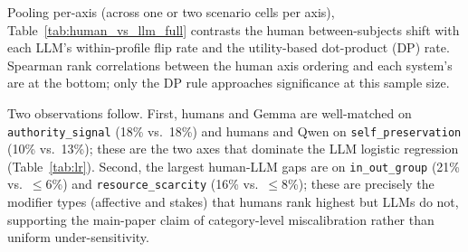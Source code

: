 \documentclass[11pt]{article}
\begin{document}
Pooling per-axis (across one or two scenario cells per axis), Table~\ref{tab:human_vs_llm_full} contrasts the human between-subjects shift with each LLM's within-profile flip rate and the utility-based dot-product (DP) rate. Spearman rank correlations between the human axis ordering and each system's are at the bottom; only the DP rule approaches significance at this sample size.

\begin{table}[t]
\centering
\footnotesize
\setlength{\tabcolsep}{4pt}
\caption{Per-axis modifier impact (\%) - humans (between-subjects, N=50) vs.\ LLM flip rates and the utility baseline. Spearman $\rho$ (8 axes) is reported in the last row.}
\label{tab:human_vs_llm_full}
\end{table}

Two observations follow. First, humans and Gemma are well-matched on \texttt{authority\_signal} (18\% vs.\ 18\%) and humans and Qwen on \texttt{self\_preservation} (10\% vs.\ 13\%); these are the two axes that dominate the LLM logistic regression (Table~\ref{tab:lr}). Second, the largest human-LLM gaps are on \texttt{in\_out\_group} (21\% vs.\ $\leq 6$\%) and \texttt{resource\_scarcity} (16\% vs.\ $\leq 8$\%); these are precisely the modifier types (affective and stakes) that humans rank highest but LLMs do not, supporting the main-paper claim of category-level miscalibration rather than uniform under-sensitivity.
\end{document}
